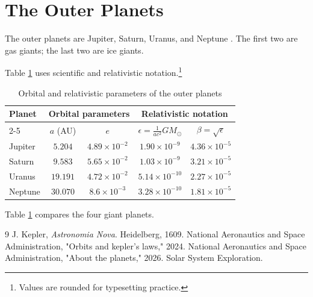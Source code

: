 \documentclass[11pt,a4paper]{article}
\begin{document}
\section{The Outer Planets}
The outer planets are Jupiter, Saturn, Uranus, and Neptune \cite{nasa_planets}. The first two are gas giants; the last two are ice giants.

Table \ref{tab:outer_planets} uses scientific and relativistic notation.\footnote{Values are rounded for typesetting practice.}

\begin{table}[h!]
\centering
\caption{Orbital and relativistic parameters of the outer planets}
\label{tab:outer_planets}
\begin{tabular}{|l|c|c|c|c|}
\hline
\rowcolor{blue!15}
\textbf{Planet} & \multicolumn{2}{c|}{\textbf{Orbital parameters}} & \multicolumn{2}{c|}{\textbf{Relativistic notation}} \\ \cline{2-5}
\rowcolor{blue!5}
 & $a$ (AU) & $e$ & $\epsilon=\frac{1}{ac^{2}}GM_{\odot}$ & $\beta=\sqrt{\epsilon}$ \\ \hline
Jupiter & $5.204$ & $4.89\times10^{-2}$ & $1.90\times10^{-9}$ & $4.36\times10^{-5}$ \\ \hline
Saturn & $9.583$ & $5.65\times10^{-2}$ & $1.03\times10^{-9}$ & $3.21\times10^{-5}$ \\ \hline
Uranus & $19.191$ & $4.72\times10^{-2}$ & $5.14\times10^{-10}$ & $2.27\times10^{-5}$ \\ \hline
Neptune & $30.070$ & $8.6\times10^{-3}$ & $3.28\times10^{-10}$ & $1.81\times10^{-5}$ \\ \hline
\end{tabular}
\end{table}

Table \ref{tab:outer_planets} compares the four giant planets.

\begin{thebibliography}{9}
J. Kepler, \textit{Astronomia Nova}. Heidelberg, 1609.
National Aeronautics and Space Administration, "Orbits and kepler's laws," 2024.
National Aeronautics and Space Administration, "About the planets," 2026. Solar System Exploration.
\end{thebibliography}
\end{document}
